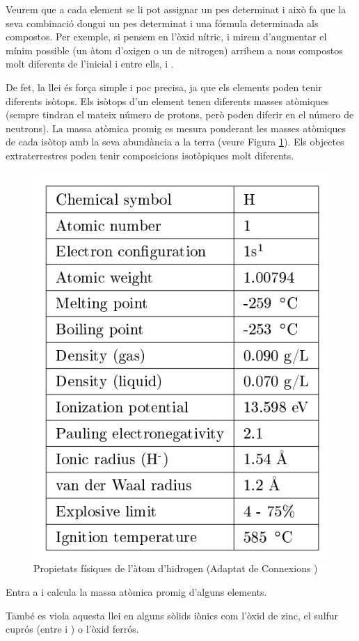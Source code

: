 Veurem que a cada element se li pot assignar un pes determinat i això fa que la seva combinació dongui un pes determinat i una fórmula determinada als compostos.
Per exemple, si pensem en l'òxid nítric,  i mirem d'augmentar el mínim possible (un àtom d'oxigen o un de nitrogen) arribem a nous compostos molt diferents de l'inicial i entre ells,  i . 

De fet, la llei és força simple i poc precisa, ja que els elements poden tenir diferents isòtops.
Els isòtops d'un element tenen diferents masses atòmiques (sempre tindran el mateix número de protons, però poden diferir en el número de neutrons). La massa atòmica promig es mesura ponderant les masses atòmiques de cada isòtop amb la seva abundància a la terra (veure Figura \ref{fig:PropietatsHidrogen}).
Els objectes extraterrestres poden tenir composicions isotòpiques molt diferents.
\begin{figure}[h]
\centering
\includegraphics[scale=0.35]{figures/PropietatsHidrogen.png}
\caption{Propietats físiques de l'àtom d'hidrogen (Adaptat de Connexions )}
\label{fig:PropietatsHidrogen}
\end{figure}
\begin{exr}
Entra a  i calcula la massa atòmica promig d'alguns elements.
\end{exr}
També es viola aquesta llei en alguns sòlids iònics com l'òxid de zinc, el sulfur cuprós (entre  i ) o l'òxid ferrós.

